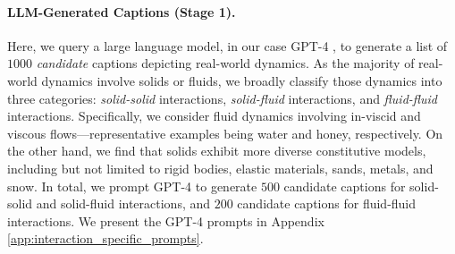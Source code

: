 \paragraph{LLM-Generated Captions (Stage 1).} Here, we query a large language model, in our case GPT-4 \cite{gpt4}, to generate a list of $1000$ \textit{candidate} captions depicting real-world dynamics. As the majority of real-world dynamics involve solids or fluids, we broadly classify those dynamics into three categories: \textit{solid-solid} interactions, \textit{solid-fluid} interactions, and \textit{fluid-fluid} interactions. Specifically, we consider fluid dynamics involving in-viscid and viscous flows—representative examples being water and honey, respectively. On the other hand, we find that solids exhibit more diverse constitutive models, including but not limited to rigid bodies, elastic materials, sands, metals, and snow. In total, we prompt GPT-4 to generate $500$ candidate captions for solid-solid and solid-fluid interactions, and $200$ candidate captions for fluid-fluid interactions. We present the GPT-4 prompts in Appendix \ref{app:interaction_specific_prompts}.  

